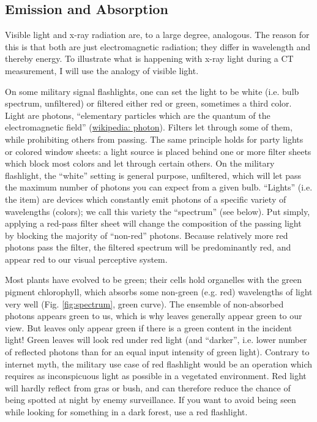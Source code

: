 \subsection{Emission and Absorption}
\label{sec:org629a7f6}
Visible light and x-ray radiation are, to a large degree, analogous.
The reason for this is that both are just electromagnetic radiation; they differ in wavelength and thereby energy.
To illustrate what is happening with x-ray light during a CT measurement, I will use the analogy of visible light.


On some military signal flashlights, one can set the light to be white (i.e. bulb spectrum, unfiltered) or filtered either red or green, sometimes a third color.
Light are photons, ``elementary particles which are the quantum of the electromagnetic field'' (\href{https://en.wikipedia.org/wiki/Photon}{wikipedia: photon}).
Filters let through some of them, while prohibiting others from passing.
The same principle holds for party lights or colored window sheets: a light source is placed behind one or more filter sheets which block most colors and let through certain others.
On the military flashlight, the ``white'' setting is general purpose, unfiltered, which will let pass the maximum number of photons you can expect from a given bulb.
``Lights'' (i.e. the item) are devices which constantly emit photons of a specific variety of wavelengths (colors); we call this variety the ``spectrum'' (see below).
Put simply, applying a red-pass filter sheet will change the composition of the passing light by blocking the majority of ``non-red'' photons.
Because relatively more red photons pass the filter, the filtered spectrum will be predominantly red, and appear red to our visual perceptive system.

Most plants have evolved to be green; their cells hold organelles with the green pigment chlorophyll, which absorbs some non-green (e.g. red) wavelengths of light very well (Fig. \ref{fig:spectrum}, green curve).
The ensemble of non-absorbed photons appears green to us, which is why leaves generally appear green to our view.
But leaves only appear green if there is a green content in the incident light!
Green leaves will look red under red light (and ``darker'', i.e. lower number of reflected photons than for an equal input intensity of green light).
Contrary to internet myth, the military use case of red flashlight would be an operation which requires as inconspicuous light as possible in a vegetated environment.
Red light will hardly reflect from gras or bush, and can therefore reduce the chance of being spotted at night by enemy surveillance.
If you want to avoid being seen while looking for something in a dark forest, use a red flashlight.



